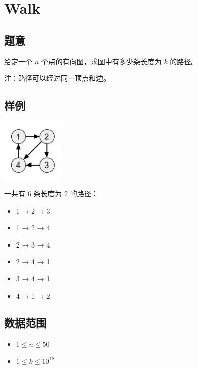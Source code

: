 \section{Walk}
\subsection*{题意}
给定一个 $n$ 个点的有向图，求图中有多少条长度为 $k$ 的路径。

注：路径可以经过同一顶点和边。
\subsection*{样例}
\begin{center}
\includegraphics[width=3cm]{Pics/R.png}

\end{center}
\begin{center}
一共有 $6$ 条长度为 $2$ 的路径：
\begin{itemize}
\item \begin{center}1 → 2 → 3\end{center}
\item \begin{center}1 → 2 → 4\end{center}
\item \begin{center}2 → 3 → 4\end{center}
\item \begin{center}2 → 4 → 1\end{center}
\item \begin{center}3 → 4 → 1\end{center}
\item \begin{center}4 → 1 → 2\end{center}
\end{itemize}
\end{center}
\subsection*{数据范围}
\begin{itemize}
\item $1 \leq n \leq 50$
\item $1 \leq k \leq 10^{18}$
\end{itemize}


